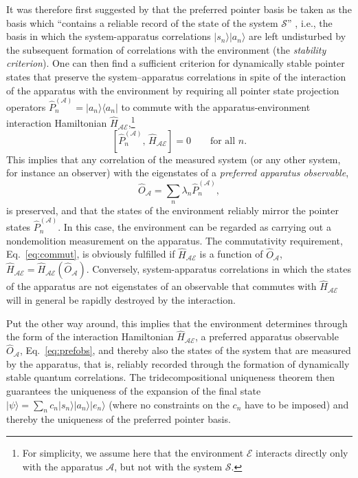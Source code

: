 \documentclass[twocolumn,rmp,aps,amsmath,amsfonts,noshowkeys,noshowpacs]{revtex4}
\newcommand{\ket}[1]{\ensuremath{|{#1\rangle}}}
\newcommand{\bra}[1]{\ensuremath{{\langle #1}|}}
\begin{document}
It was therefore first suggested by \citet{Zurek:1981:dd} that the
preferred pointer basis be taken as the basis which ``contains a
reliable record of the state of the system $\mathcal{S}$''
\citep[p.~1519]{Zurek:1981:dd}, i.e., the basis in which the
system-apparatus correlations $\ket{s_n}\ket{a_n}$ are left
undisturbed by the subsequent formation of correlations with the
environment (the {\em stability criterion}). One can then find a
sufficient criterion for dynamically stable pointer states that
preserve the system--apparatus correlations in spite of the
interaction of the apparatus with the environment by requiring all
pointer state projection operators $\widehat{P}^{(\mathcal{A})}_n =
\ket{a_n} \bra{a_n}$ to commute with the apparatus-environment
interaction Hamiltonian $\widehat{H}_\mathcal{AE}$,\footnote{For
  simplicity, we assume here that the environment $\mathcal{E}$
  interacts directly only with the apparatus $\mathcal{A}$, but not
  with the system $\mathcal{S}$.}
%
\begin{equation} \label{eq:commut}
[\widehat{P}^{(\mathcal{A})}_n, \,
\widehat{H}_\mathcal{AE}] = 0 \qquad \text{for all $n$.}
\end{equation}
%
This implies that any correlation of the measured system (or any
other system, for instance an observer) with the eigenstates of a
\emph{preferred apparatus observable},
%
\begin{equation} \label{eq:prefobs} \widehat{O}_\mathcal{A} = \sum_n \lambda_n
\widehat{P}^{(\mathcal{A})}_n, \end{equation}
%
is preserved, and that the states of the environment reliably mirror
the pointer states $\widehat{P}^{(\mathcal{A})}_n$. In this case, the
environment can be regarded as carrying out a nondemolition
measurement on the apparatus. The commutativity requirement,
Eq.~\eqref{eq:commut}, is obviously fulfilled if
$\widehat{H}_\mathcal{AE}$ is a function of $\widehat{O}_\mathcal{A}$,
$\widehat{H}_\mathcal{AE}=\widehat{H}_\mathcal{AE}(\widehat{O}_\mathcal{A})$.
Conversely, system-apparatus correlations in which the states of the
apparatus are not eigenstates of an observable that commutes with
$\widehat{H}_\mathcal{AE}$ will in general be rapidly destroyed by the
interaction.

Put the other way around, this implies that the environment determines
through the form of the interaction Hamiltonian
$\widehat{H}_\mathcal{AE}$, a preferred apparatus observable
$\widehat{O}_\mathcal{A}$, Eq.~\eqref{eq:prefobs}, and thereby also
the states of the system that are measured by the apparatus, that is,
reliably recorded through the formation of dynamically stable quantum
correlations. The tridecompositional uniqueness theorem then
guarantees the uniqueness of the expansion of the final state
$\ket{\psi} = \sum_n c_n \ket{s_n} \ket{a_n} \ket{e_n}$ (where no
constraints on the $c_n$ have to be imposed) and thereby the
uniqueness of the preferred pointer basis.
\end{document}
